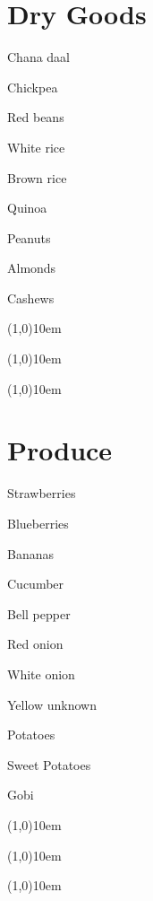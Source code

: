 \documentclass{article}
\begin{document}
\begin{multicols}{3}
      \section*{Dry Goods}
         \begin{shoppingList}
            \item Chana daal
            \item Chickpea
            \item Red beans
            \item White rice
            \item Brown rice
            \item Quinoa
            \item Peanuts
            \item Almonds
            \item Cashews
            \item \line(1,0){10em}
            \item \line(1,0){10em}
            \item \line(1,0){10em}
         \end{shoppingList}
      \section*{Produce}
         \begin{shoppingList}
            \item Strawberries
            \item Blueberries
            \item Bananas
            \item Cucumber
            \item Bell pepper
            \item Red onion
            \item White onion
            \item Yellow unknown
            \item Potatoes
            \item Sweet Potatoes
            \item Gobi
            \item \line(1,0){10em}
            \item \line(1,0){10em}
            \item \line(1,0){10em}
         \end{shoppingList}

\end{multicols}
\end{document}
